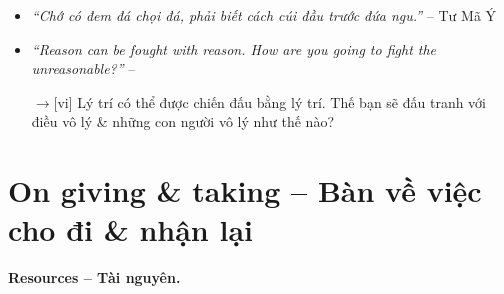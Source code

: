 \documentclass[12pt,oneside]{book}
\begin{document}
\begin{itemize}
	\item {\sf[cn$\to$vi]} {\it``Chớ có đem đá chọi đá, phải biết cách cúi đầu trước đứa ngu.''} -- {\sc Tư Mã Ý}
	
	\item {\it``Reason can be fought with reason. How are you going to fight the unreasonable?''} -- \cite{Rand_fountainhead}
	
	{\sf[en]$\to$[vi]} Lý trí có thể được chiến đấu bằng lý trí. Thế bạn sẽ đấu tranh với điều vô lý \& những con người vô lý như thế nào?
\end{itemize}


\section{On giving \& taking -- Bàn về việc cho đi \& nhận lại}
{\bf \textsf{Resources -- Tài nguyên.}}
\end{document}
